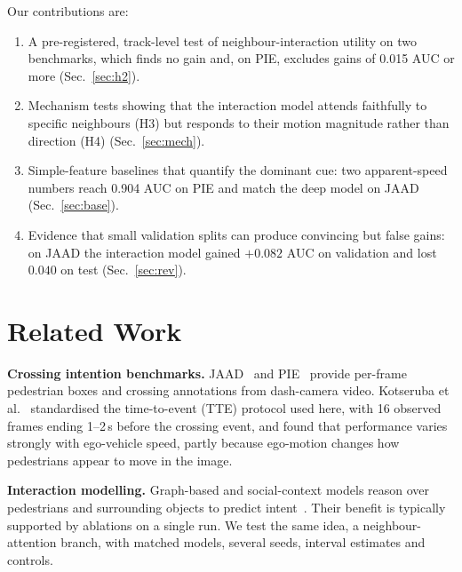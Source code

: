 \documentclass[conference]{IEEEtran}
\begin{document}
\noindent Our contributions are:
\begin{enumerate}
  \item A pre-registered, track-level test of neighbour-interaction utility on two benchmarks, which finds no gain and, on PIE, excludes gains of 0.015 AUC or more (Sec.~\ref{sec:h2}).
  \item Mechanism tests showing that the interaction model attends faithfully to specific neighbours (H3) but responds to their motion magnitude rather than direction (H4) (Sec.~\ref{sec:mech}).
  \item Simple-feature baselines that quantify the dominant cue: two apparent-speed numbers reach 0.904 AUC on PIE and match the deep model on JAAD (Sec.~\ref{sec:base}).
  \item Evidence that small validation splits can produce convincing but false gains: on JAAD the interaction model gained $+0.082$ AUC on validation and lost $0.040$ on test (Sec.~\ref{sec:rev}).
\end{enumerate}

\section{Related Work}
\textbf{Crossing intention benchmarks.} JAAD~\cite{rasouli2017jaad} and PIE~\cite{rasouli2019pie} provide per-frame pedestrian boxes and crossing annotations from dash-camera video. Kotseruba et al.~\cite{kotseruba2021benchmark} standardised the time-to-event (TTE) protocol used here, with 16 observed frames ending 1--2\,s before the crossing event, and found that performance varies strongly with ego-vehicle speed, partly because ego-motion changes how pedestrians appear to move in the image.

\textbf{Interaction modelling.} Graph-based and social-context models reason over pedestrians and surrounding objects to predict intent~\cite{liu2020strr,yau2021graphsim,zhai2022social}. Their benefit is typically supported by ablations on a single run. We test the same idea, a neighbour-attention branch, with matched models, several seeds, interval estimates and controls.
\end{document}
